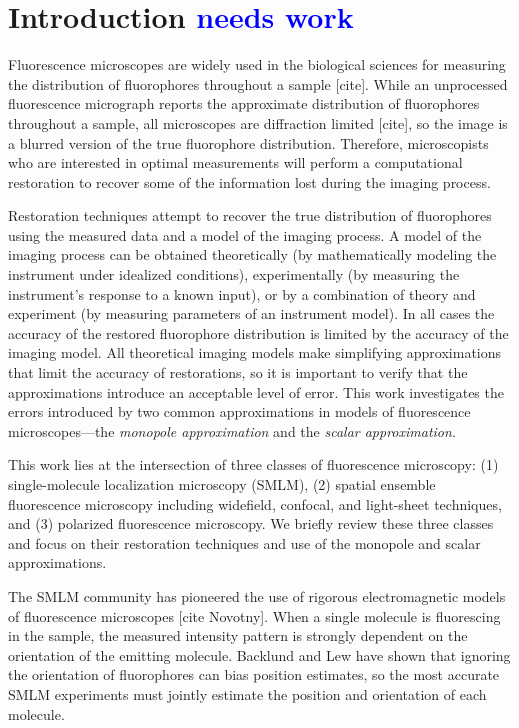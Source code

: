 \documentclass{osa-article}
\providecommand{\tb}[1]{\textcolor{blue}{#1}}
\begin{document}
\section{Introduction \tb{needs work}}

Fluorescence microscopes are widely used in the biological sciences for
measuring the distribution of fluorophores throughout a sample [cite]. While an
unprocessed fluorescence micrograph reports the approximate distribution of
fluorophores throughout a sample, all microscopes are diffraction limited
[cite], so the image is a blurred version of the true fluorophore distribution.
Therefore, microscopists who are interested in optimal measurements will perform
a computational restoration to recover some of the information lost during the
imaging process.

Restoration techniques attempt to recover the true distribution of fluorophores
using the measured data and a model of the imaging process. A model of the
imaging process can be obtained theoretically (by mathematically modeling the
instrument under idealized conditions), experimentally (by measuring the
instrument's response to a known input), or by a combination of theory and
experiment (by measuring parameters of an instrument model). In all cases the
accuracy of the restored fluorophore distribution is limited by the accuracy of
the imaging model. All theoretical imaging models make simplifying
approximations that limit the accuracy of restorations, so it is important to
verify that the approximations introduce an acceptable level of error. This work
investigates the errors introduced by two common approximations in models of
fluorescence microscopes---the \textit{monopole approximation} and the
\textit{scalar approximation}.

This work lies at the intersection of three classes of fluorescence microscopy:
(1) single-molecule localization microscopy (SMLM), (2) spatial ensemble
fluorescence microscopy including widefield, confocal, and light-sheet
techniques, and (3) polarized fluorescence microscopy. We briefly review these
three classes and focus on their restoration techniques and use of the monopole
and scalar approximations.

The SMLM community has pioneered the use of rigorous electromagnetic models of
fluorescence microscopes \cite{backer2014, lieb2004} [cite Novotny]. When a
single molecule is fluorescing in the sample, the measured intensity pattern is
strongly dependent on the orientation of the emitting molecule. Backlund and Lew
\cite{backlund2014} have shown that ignoring the orientation of fluorophores can
bias position estimates, so the most accurate SMLM experiments must jointly
estimate the position and orientation of each molecule.
\end{document}
